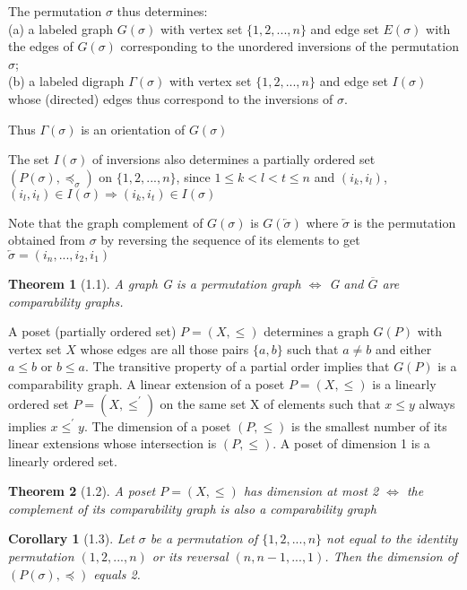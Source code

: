 \documentclass{article}
\newtheorem*{theorem}{Theorem}
\newtheorem*{corollary}{Corollary}
\begin{document}
The permutation $\sigma$ thus determines: \\
(a) a labeled graph $G(\sigma)$ with vertex set $\{ 1, 2, ..., n\}$ and edge set $E(\sigma)$ with the edges of $G(\sigma)$ corresponding to the unordered inversions of the permutation $\sigma$; \\
(b) a labeled digraph $\Gamma(\sigma)$ with vertex set $\{ 1, 2, ..., n \}$ and edge set $I(\sigma)$ whose (directed) edges thus correspond to the inversions of $\sigma$.

Thus $\Gamma(\sigma)$ is an orientation of $G(\sigma)$

The set $I(\sigma)$ of inversions also determines a partially ordered set $(P(\sigma), \preceq_{\sigma})$ on $\{1, 2, ..., n\}$, since $1 \leq k < l < t \leq n$ and $(i_k, i_l)$, $(i_l, i_t) \in I(\sigma) \Rightarrow (i_k, i_t) \in I(\sigma)$  

Note that the graph complement of $G(\sigma)$ is $G(\overleftarrow{\sigma})$ where $\overleftarrow{\sigma}$ is the permutation obtained from $\sigma$ by reversing the sequence of its elements to get $\overleftarrow{\sigma} = (i_n, ..., i_2, i_1)$

\begin{theorem}[1.1]
    A graph G is a permutation graph $\Leftrightarrow$ G and $\overline{G}$ are comparability graphs.
\end{theorem}

A poset (partially ordered set) $P = (X, \leq)$ determines a graph $G(P)$ with vertex set $X$ whose edges are all those pairs $\{ a, b \}$ such that $a \neq b$ and either $a \leq b$ or $b \leq a$. The transitive property of a partial order implies that $G(P)$ is a comparability graph. A linear extension of a poset $P = (X, \leq)$ is a linearly ordered set $P = (X, \leq^{'})$ on the same set X of elements such that $x \leq y$ always implies $x \leq^{'} y$. The dimension of a poset $(P, \leq)$ is the smallest number of its linear extensions whose intersection is $(P, \leq)$. A poset of dimension 1 is a linearly ordered set.

\begin{theorem}[1.2]
    A poset $P = (X, \leq)$ has dimension at most 2 $\Leftrightarrow$ the complement of its comparability graph is also a comparability graph
\end{theorem}

\begin{corollary}[1.3]
    Let $\sigma$ be a permutation of $\{ 1, 2, ..., n\}$ not equal to the identity permutation $(1, 2, ..., n)$ or its reversal $(n, n-1, ..., 1)$. Then the dimension of $(P(\sigma), \preceq)$ equals 2.
\end{corollary}
\end{document}
